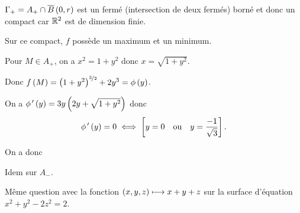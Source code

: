 \begin{corr}
\(\Gamma_+=A_+\inter\boulef{0}{r}\) est un fermé (intersection de deux fermés) borné et donc un compact car \(\mathbb{R}^2\) est de dimension finie.

Sur ce compact, \(f\) possède un maximum et un minimum.

Pour \(M\in A_+\), on a \(x^2=1+y^2\) donc \(x=\sqrt{1+y^2}\).

Donc \(f\left(M\right)=\left(1+y^2\right)^{\nicefrac{3}{2}}+2y^3=\phi\left(y\right)\).

On a \(\phi^{\,\prime}\left(y\right)=3y\left(2y+\sqrt{1+y^2}\right)\) donc \[\phi^{\,\prime}\left(y\right)=0\iff\left[y=0\quad\text{ou}\quad y=\dfrac{-1}{\sqrt{3}}\right].\]

On a donc \begin{center}
\end{center}

Idem sur \(A_-\).
\end{corr}

\begin{exo}
Même question avec la fonction \(\left(x,y,z\right)\longmapsto x+y+z\) sur la surface d'équation \(x^2+y^2-2z^2=2\).
\end{exo}

